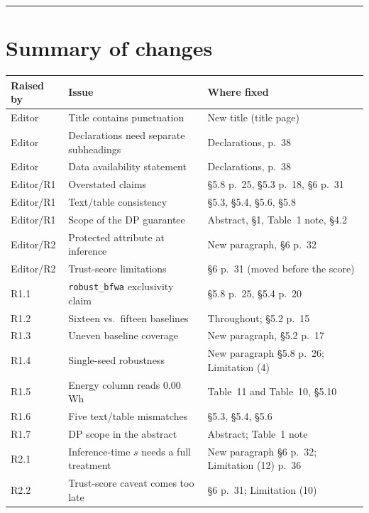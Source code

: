 \documentclass[11pt,a4paper]{article}
\begin{document}
\vspace{0.5em}
\hrule
\vspace{0.5em}

\section{Summary of changes}

\begin{tabular}{@{}p{1.6cm}p{7.4cm}p{7.0cm}@{}}
\toprule
\textbf{Raised by} & \textbf{Issue} & \textbf{Where fixed} \\
\midrule
Editor & Title contains punctuation & New title (title page) \\
Editor & Declarations need separate subheadings & Declarations, p.~38 \\
Editor & Data availability statement & Declarations, p.~38 \\
Editor/R1 & Overstated claims & \S5.8 p.~25, \S5.3 p.~18, \S6 p.~31 \\
Editor/R1 & Text/table consistency & \S5.3, \S5.4, \S5.6, \S5.8 \\
Editor/R1 & Scope of the DP guarantee & Abstract, \S1, Table~1 note, \S4.2 \\
Editor/R2 & Protected attribute at inference & New paragraph, \S6 p.~32 \\
Editor/R2 & Trust-score limitations & \S6 p.~31 (moved before the score) \\
R1.1 & \texttt{robust\_bfwa} exclusivity claim & \S5.8 p.~25, \S5.4 p.~20 \\
R1.2 & Sixteen vs.\ fifteen baselines & Throughout; \S5.2 p.~15 \\
R1.3 & Uneven baseline coverage & New paragraph, \S5.2 p.~17 \\
R1.4 & Single-seed robustness & New paragraph \S5.8 p.~26; Limitation (4) \\
R1.5 & Energy column reads 0.00\,Wh & Table~11 and Table~10, \S5.10 \\
R1.6 & Five text/table mismatches & \S5.3, \S5.4, \S5.6 \\
R1.7 & DP scope in the abstract & Abstract; Table~1 note \\
R2.1 & Inference-time $s$ needs a full treatment & New paragraph \S6 p.~32; Limitation (12) p.~36 \\
R2.2 & Trust-score caveat comes too late & \S6 p.~31; Limitation (10) \\
\bottomrule
\end{tabular}

\vspace{0.8em}
\end{document}
